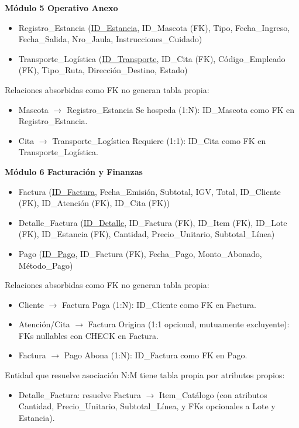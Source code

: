 \vspace{0.5cm}
\noindent \textbf{Módulo 5 Operativo Anexo}

\begin{itemize}
	\item Registro\_Estancia (\underline{ID\_Estancia}, ID\_Mascota (FK), Tipo, Fecha\_Ingreso, Fecha\_Salida, Nro\_Jaula, Instrucciones\_Cuidado)
	\item Transporte\_Logística (\underline{ID\_Transporte}, ID\_Cita (FK), Código\_Empleado (FK), Tipo\_Ruta, Dirección\_Destino, Estado)
\end{itemize}

Relaciones absorbidas como FK no generan tabla propia:
\begin{itemize}
	\item Mascota $\rightarrow$ Registro\_Estancia Se hospeda (1:N): ID\_Mascota como FK en Registro\_Estancia.
	\item Cita $\rightarrow$ Transporte\_Logística Requiere (1:1): ID\_Cita como FK en Transporte\_Logística.
\end{itemize}

\vspace{0.5cm}
\noindent \textbf{Módulo 6 Facturación y Finanzas}

\begin{itemize}
	\item Factura (\underline{ID\_Factura}, Fecha\_Emisión, Subtotal, IGV, Total, ID\_Cliente (FK), ID\_Atención (FK), ID\_Cita (FK))
	\item Detalle\_Factura (\underline{ID\_Detalle}, ID\_Factura (FK), ID\_Item (FK), ID\_Lote (FK), ID\_Estancia (FK), Cantidad, Precio\_Unitario, Subtotal\_Línea)
	\item Pago (\underline{ID\_Pago}, ID\_Factura (FK), Fecha\_Pago, Monto\_Abonado, Método\_Pago)
\end{itemize}

Relaciones absorbidas como FK no generan tabla propia:
\begin{itemize}
	\item Cliente $\rightarrow$ Factura Paga (1:N): ID\_Cliente como FK en Factura.
	\item Atención/Cita $\rightarrow$ Factura Origina (1:1 opcional, mutuamente excluyente): FKs nullables con CHECK en Factura.
	\item Factura $\rightarrow$ Pago Abona (1:N): ID\_Factura como FK en Pago.
\end{itemize}

Entidad que resuelve asociación N:M tiene tabla propia por atributos propios:
\begin{itemize}
	\item Detalle\_Factura: resuelve Factura $\rightarrow$ Item\_Catálogo (con atributos Cantidad, Precio\_Unitario, Subtotal\_Línea, y FKs opcionales a Lote y Estancia).
\end{itemize}

